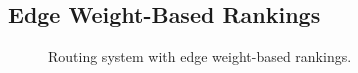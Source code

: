 
\subsection{Edge Weight-Based Rankings}
\label{ssec:ew}

\begin{figure}
\centering
\begin{psfrags}
%
%
\end{psfrags}
\caption{Routing system with edge weight-based rankings.} 
\label{fig:edgeweight}
\end{figure}

